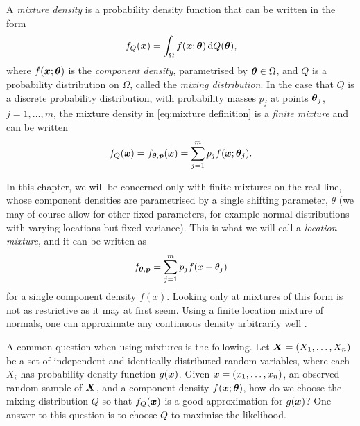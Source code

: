 
	A \emph{mixture density} is a probability density function that can be written in the form
	\begin{equation}
		f_Q({\bm{{x}}}) = \int_\Omega f({\bm{{x}}}; {\bm{{\theta}}}) \, \mathrm{d} Q({\bm{{\theta}}}),
		\label{eq:mixture definition}
	\end{equation}
	where $f({\bm{{x}}};{\bm{{\theta}}})$ is the \emph{component density}, parametrised by ${\bm{{\theta}}} \in \Omega$, and $Q$ is a probability distribution on $\Omega$, called the \emph{mixing distribution}. In the case that $Q$ is a discrete probability distribution, with probability masses $p_j$ at points ${\bm{{\theta}}}_j$, $j = 1, \dots, m$, the mixture density in \eqref{eq:mixture definition} is a \emph{finite mixture} and can be written
	\begin{equation}
		f_Q({\bm{{x}}}) = f_{{\bm{{\theta}}}, {\bm{{p}}}}({\bm{{x}}}) = \sum_{j = 1}^m p_j f({\bm{{x}}}; {\bm{{\theta}}}_j).
	\end{equation}

	In this chapter, we will be concerned only with finite mixtures on the real line, whose component densities are parametrised by a single shifting parameter, $\theta$ (we may of course allow for other fixed parameters, for example normal distributions with varying locations but fixed variance). This is what we will call a \emph{location mixture}, and it can be written as
	\begin{equation}
		f_{{\bm{{\theta}}}, {\bm{{p}}}} = \sum_{j = 1}^m p_j f(x - \theta_j)
		\label{eq:location mixture}
	\end{equation}
	for a single component density $f(x)$.
	Looking only at mixtures of this form is not as restrictive as it may at first seem. Using a finite location mixture of normals, one can approximate any continuous density arbitrarily well \cite{Nguyen2018-qx}.

	A common question when using mixtures is the following. Let ${\bm{{X}}} = (X_1, \dots, X_n)$ be a set of independent and identically distributed random variables, where each $X_i$ has probability density function $g({\bm{{x}}})$. Given ${\bm{{x}}} = (x_1, \dots, x_n)$, an observed random sample of ${\bm{{X}}}$, and a component density $f({\bm{{x}}}; {\bm{{\theta}}})$, how do we choose the mixing distribution $Q$ so that $f_Q({\bm{{x}}})$ is a good approximation for $g({\bm{{x}}})$?	One answer to this question is to choose $Q$ to maximise the likelihood.

